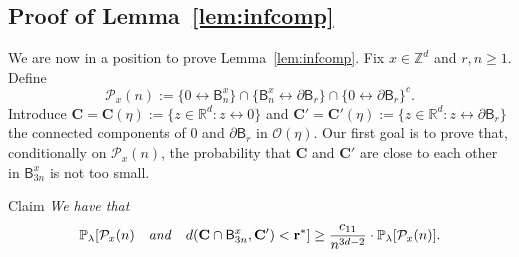 \documentclass[10pt]{amsart}
\theoremstyle{definition}\newtheorem{defi}[theo]{Definition}\newtheorem{rema}[theo]{Remark}\newtheorem{exam}[theo]{Example}\newtheorem{exem}[theo]{Example}\newtheorem{nota}[theo]{Notation}
\newcommand{\rbf}{\mathbf{r}}
\newcommand{\Cbf}{\mathbf{C}}
\begin{document}
\subsection{Proof of Lemma~\ref{lem:infcomp}}\label{sec:lemma}
We are now in a position to prove Lemma~\ref{lem:infcomp}. Fix $x \in {\mathbb Z}^d$ and $r,n\ge1$. Define
\[
{\mathcal P}_x(n):=\{0\longleftrightarrow \mathsf B_{n}^x\}\cap\{\mathsf B_n^x \longleftrightarrow \partial \mathsf B_r\}\cap\{0 \longleftrightarrow \partial \mathsf B_r\}^c.
\]
Introduce ${\Cbf}={\Cbf}(\eta) := \{z \in {\mathbb R}^d: z \stackrel{}{\longleftrightarrow} 0\}$ and ${\Cbf}'={\Cbf}'(\eta):=\{z \in{\mathbb R}^d: z \stackrel{}{\longleftrightarrow} \partial\mathsf B_r\}$ the connected components of 0 and $\partial\mathsf B_r$ in ${\mathcal O}(\eta)$. Our first goal is to prove that, conditionally on ${\mathcal P}_x(n)$, the probability that ${\Cbf}$ and ${\Cbf}'$ are close to each other in $\mathsf B^x_{3n}$ is not too small.


\begin{enonce}[plain]{Claim}\label{claim310}
\emph{We have that}
\[
{\mathbb P}_\lambda[{\mathcal P}_x(n)\quad\text{\emph{and}}\quad d({\Cbf}\cap\mathsf B^x_{3n},{\Cbf}')<\rbf^{*}]\ge \frac{c_{11}}{n^{3d-2}}\cdot{\mathbb P}_\lambda[{\mathcal P}_x(n)].
\]
\end{enonce}
\end{document}
